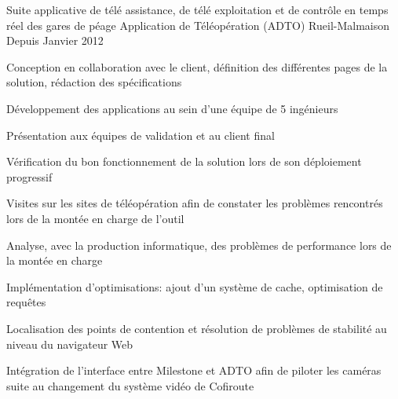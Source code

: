 \vspace{-2.0mm}


\begin{cventries}

  \cventry
    {Suite applicative de télé assistance, de télé exploitation et de contrôle en temps réel des gares de péage} %
    {Application de Téléopération (ADTO)} %
    {Rueil-Malmaison} %
    {Depuis Janvier 2012} %
    {
      \begin{cvitems} %
        \item {Conception en collaboration avec le client, définition des différentes pages de la solution, rédaction des spécifications}
        \item {Développement des applications au sein d'une équipe de 5 ingénieurs}
        \item {Présentation aux équipes de validation et au client final}
        \item {Vérification du bon fonctionnement de la solution lors de son déploiement progressif}
        \item {Visites sur les sites de téléopération afin de constater les problèmes rencontrés lors de la montée en charge de l'outil}
        \item {Analyse, avec la production informatique, des problèmes de performance lors de la montée en charge}
        \item {Implémentation d'optimisations: ajout d'un système de cache, optimisation de requêtes}
        \item {Localisation des points de contention et résolution de problèmes de stabilité au niveau du navigateur Web}
        \item {Intégration de l'interface entre Milestone et ADTO afin de piloter les caméras suite au changement du système vidéo de Cofiroute}
      \end{cvitems}
    } 
\end{cventries}

